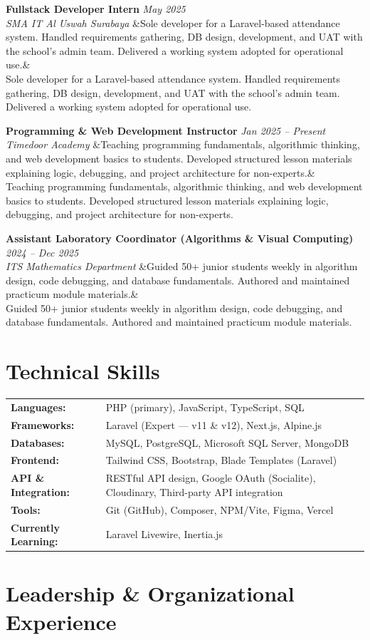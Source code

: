 \documentclass[a4paper,11pt]{article}
\newcommand{\cventry}[4]{%
  \noindent\textbf{#1} \hfill \textit{#3} \\
  \textit{#2}
  \ifx&#4& \else \\ \small #4 \fi
  \vspace{6pt}
}
\begin{document}
\cventry
  {Fullstack Developer Intern}
  {SMA IT Al Uswah Surabaya}
  {May 2025}
  {Sole developer for a Laravel-based attendance system. Handled requirements gathering, DB design, development, and UAT with the school's admin team. Delivered a working system adopted for operational use.}

\cventry
  {Programming \& Web Development Instructor}
  {Timedoor Academy}
  {Jan 2025 -- Present}
  {Teaching programming fundamentals, algorithmic thinking, and web development basics to students. Developed structured lesson materials explaining logic, debugging, and project architecture for non-experts.}

\cventry
  {Assistant Laboratory Coordinator (Algorithms \& Visual Computing)}
  {ITS Mathematics Department}
  {2024 -- Dec 2025}
  {Guided 50+ junior students weekly in algorithm design, code debugging, and database fundamentals. Authored and maintained practicum module materials.}

\section{Technical Skills}

\begin{tabularx}{\textwidth}{@{}l X@{}}
\textbf{Languages:} & PHP (primary), JavaScript, TypeScript, SQL \\[3pt]
\textbf{Frameworks:} & Laravel (Expert — v11 \& v12), Next.js, Alpine.js \\[3pt]
\textbf{Databases:} & MySQL, PostgreSQL, Microsoft SQL Server, MongoDB \\[3pt]
\textbf{Frontend:} & Tailwind CSS, Bootstrap, Blade Templates (Laravel) \\[3pt]
\textbf{API \& Integration:} & RESTful API design, Google OAuth (Socialite), Cloudinary, Third-party API integration \\[3pt]
\textbf{Tools:} & Git (GitHub), Composer, NPM/Vite, Figma, Vercel \\[3pt]
\textbf{Currently Learning:} & Laravel Livewire, Inertia.js \\
\end{tabularx}

\section{Leadership \& Organizational Experience}
\end{document}
